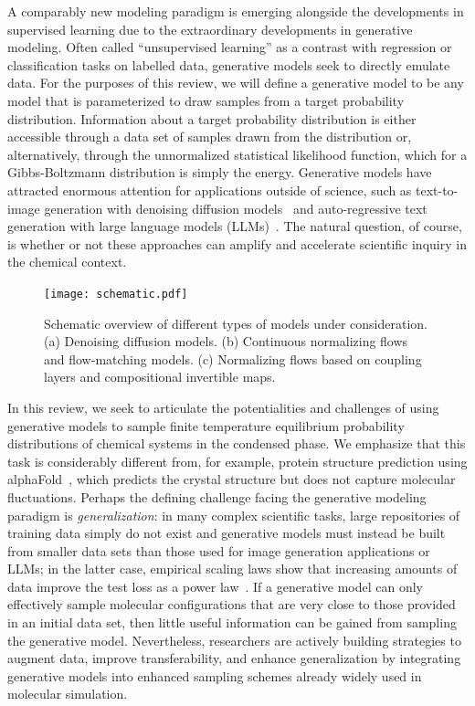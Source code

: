 \documentclass[11pt]{article}
\begin{document}
A comparably new modeling paradigm is emerging alongside the developments in supervised learning due to the extraordinary developments in generative modeling.
Often called ``unsupervised learning'' as a contrast with regression or classification tasks on labelled data, generative models seek to directly emulate data.
For the purposes of this review, we will define a generative model to be any model that is parameterized to draw samples from a target probability distribution.
Information about a target probability distribution is either accessible through a data set of samples drawn from the distribution or, alternatively, through the unnormalized statistical likelihood function, which for a Gibbs-Boltzmann distribution is simply the energy.  
Generative models have attracted enormous attention for applications outside of science, such as text-to-image generation with denoising diffusion models~\cite{song_score-based_2022,ho_denoising_nodate} and auto-regressive text generation with large language models (LLMs)~\cite{vaswani_attention_2017}. 
The natural question, of course, is whether or not these approaches can amplify and accelerate scientific inquiry in the chemical context.

\begin{figure}
\begin{center}
\texttt{[image: schematic.pdf]}
\end{center}
\caption{Schematic overview of different types of models under consideration. (a) Denoising diffusion models. (b) Continuous normalizing flows and flow-matching models. (c) Normalizing flows based on coupling layers and compositional invertible maps.}
\label{fig:models}
\end{figure}

In this review, we seek to articulate the potentialities and challenges of using generative models to sample finite temperature equilibrium probability distributions of chemical systems in the condensed phase.
We emphasize that this task is considerably different from, for example, protein structure prediction using alphaFold~\cite{jumper_highly_2021, watson_novo_2023}, which predicts the crystal structure but does not capture molecular fluctuations.
Perhaps the defining challenge facing the generative modeling paradigm is \emph{generalization}: in many complex scientific tasks, large repositories of training data simply do not exist and generative models must instead be built from smaller data sets than those used for image generation applications or LLMs; in the latter case, empirical scaling laws show that increasing amounts of data improve the test loss as a power law~\cite{kaplan_scaling_2020, dyer_explaining_2021}.
If a generative model can only effectively sample molecular configurations that are very close to those provided in an initial data set, then little useful information can be gained from sampling the generative model. 
Nevertheless, researchers are actively building strategies to augment data, improve transferability, and enhance generalization by integrating generative models into enhanced sampling schemes already widely used in molecular simulation.
\end{document}

